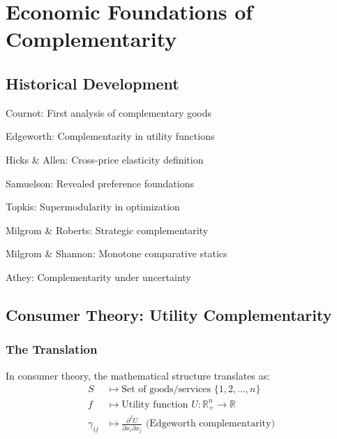 \section{Economic Foundations of Complementarity}
\label{sec:economics}

\subsection{Historical Development}

\begin{tcolorbox}[colback=gray!5!white,colframe=gray!75!black,title=\textbf{Timeline: Complementarity in Economics}]
\begin{description}[noitemsep]
    \item[1838] Cournot: First analysis of complementary goods
    \item[1881] Edgeworth: Complementarity in utility functions
    \item[1934] Hicks \& Allen: Cross-price elasticity definition
    \item[1947] Samuelson: Revealed preference foundations
    \item[1978] Topkis: Supermodularity in optimization
    \item[1990] Milgrom \& Roberts: Strategic complementarity
    \item[1994] Milgrom \& Shannon: Monotone comparative statics
    \item[2007] Athey: Complementarity under uncertainty
\end{description}
\end{tcolorbox}

\subsection{Consumer Theory: Utility Complementarity}

\subsubsection{The Translation}

\begin{axiom}
In consumer theory, the mathematical structure translates as:
\begin{align}
S &\mapsto \text{Set of goods/services } \{1, 2, \ldots, n\} \\
f &\mapsto \text{Utility function } U: \mathbb{R}^n_+ \to \mathbb{R} \\
\gamma_{ij} &\mapsto \frac{\partial^2 U}{\partial x_i \partial x_j} \text{ (Edgeworth complementarity)}
\end{align}
\end{axiom}

